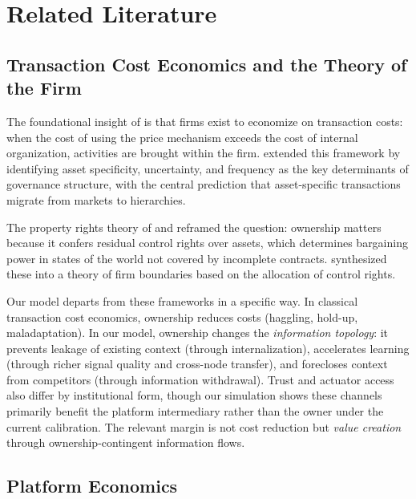 \documentclass[12pt]{article}
\theoremstyle{definition}
\begin{document}
\section{Related Literature}

\subsection{Transaction Cost Economics and the Theory of the Firm}

The foundational insight of \citet{coase1937} is that firms exist to economize on transaction costs: when the cost of using the price mechanism exceeds the cost of internal organization, activities are brought within the firm. \citet{williamson1975, williamson1985} extended this framework by identifying asset specificity, uncertainty, and frequency as the key determinants of governance structure, with the central prediction that asset-specific transactions migrate from markets to hierarchies.

The property rights theory of \citet{grossman1986} and \citet{hart1990} reframed the question: ownership matters because it confers residual control rights over assets, which determines bargaining power in states of the world not covered by incomplete contracts. \citet{hart1995} synthesized these into a theory of firm boundaries based on the allocation of control rights.

Our model departs from these frameworks in a specific way. In classical transaction cost economics, ownership reduces costs (haggling, hold-up, maladaptation). In our model, ownership changes the \textit{information topology}: it prevents leakage of existing context (through internalization), accelerates learning (through richer signal quality and cross-node transfer), and forecloses context from competitors (through information withdrawal). Trust and actuator access also differ by institutional form, though our simulation shows these channels primarily benefit the platform intermediary rather than the owner under the current calibration. The relevant margin is not cost reduction but \textit{value creation} through ownership-contingent information flows.

\subsection{Platform Economics}
\end{document}
